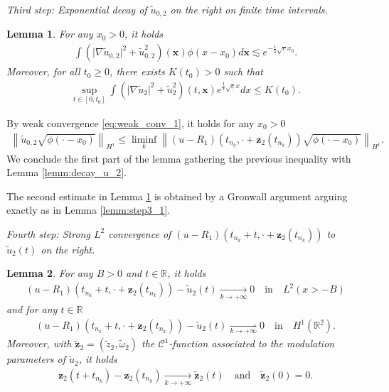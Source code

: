 \documentclass[reqno,10pt]{amsart}
\newtheorem{lemm}{Lemma}[section]
\numberwithin{equation}{section}
\newcommand{\bx}{\mathbf{x}}
\newcommand{\bz}{\mathbf{z}}
\begin{document}
\vspace{0.5cm}
\noindent \textit{Third step: Exponential decay of $\tilde{u}_{0,2}$ on the right on finite time intervals.}


\begin{lemm} \label{lemm:step3_2}
	For any $x_0>0$, it holds
	\begin{align*}
		\int \left( \vert \nabla \tilde{u}_{0,2} \vert ^2 + \tilde{u}_{0,2}^2 \right) (\bx) \phi (x-x_0) d\bx \lesssim e^{-\frac14 \sqrt{\underline{c}}x_0}.
	\end{align*}
	Moreover, for all $t_0\geq 0$, there exists $K(t_0)>0$ such that
	\begin{align*}
		\sup_{t\in [0,t_0]} \int \left(\vert \nabla \tilde{u}_2\vert^2 + \tilde{u}_2^2 \right) \left(t, \bx \right) e^{\frac14 \sqrt{\underline{c}}x} dx \leq K(t_0).
	\end{align*}
\end{lemm}
By weak convergence \eqref{eq:weak_conv_1}, it holds for any $x_0>0$
\begin{align*}
\left\| \tilde{u}_{0,2} \sqrt{\phi (\cdot-x_0)} \right\|_{H^1} \leq \liminf_{k} \left\| \left( u - R_1 \right) \left(  t_{n_k}, \cdot +  \bz_2(t_{n_k}) \right)  \sqrt{\phi (\cdot-x_0)} \right\|_{H^1}.
\end{align*} 
We conclude the first part of the lemma gathering the previous inequality with Lemma \ref{lemm:decay_u_2}. 

The second estimate in Lemma \ref{lemm:step3_2} is obtained by a Gronwall argument arguing exactly as in Lemma \ref{lemm:step3_1}.



\vspace{0.5cm}
\noindent \textit{Fourth step: Strong $L^2$ convergence of $\left( u - R_1 \right) (t_{n_k}+t, \cdot+ \bz_2(t_{n_k}))$ to $\tilde{u}_2(t)$ on the right.}

\begin{lemm}\label{lemm:step4_2}
	For any $B>0$ and $t \in \mathbb{R}$, it holds
	\begin{align*}
		\left( u -R_1 \right) \left( t_{n_k}+t, \cdot + \bz_2(t_{n_k}) \right) - \tilde{u}_2(t) \underset{k \rightarrow + \infty}{\rightarrow} 0 \quad \text{in} \quad L^2(x>-B)
	\end{align*}
	and for any $t\in \mathbb{R}$
	\begin{align*}
		\left( u -R_1 \right) \left( t_{n_k}+t, \cdot + \bz_2(t_{n_k}) \right) - \tilde{u}_2(t) \underset{k \rightarrow + \infty}{\rightharpoonup} 0 \quad \text{in} \quad H^1(\mathbb{R}^2).
	\end{align*}
	Moreover, with $\tilde{\bz}_2=(\tilde{z}_2, \tilde{\omega}_2)$ the $\mathcal{C}^1$-function associated to the modulation parameters of $\tilde{u}_2$, it holds
	\begin{align*}
		\bz_2(t+t_{n_k}) - \bz_2(t_{n_k}) \underset{k \to +\infty}{\rightarrow}\tilde{\bz}_2(t) \quad \text{and} \quad \tilde{\bz}_2(0)=0.
	\end{align*}
\end{lemm}
\end{document}
